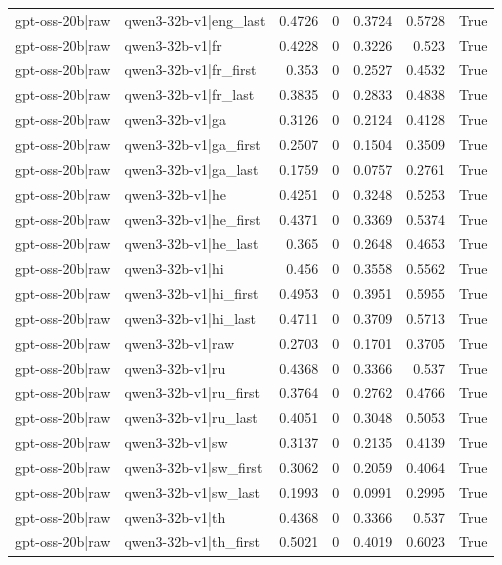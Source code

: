 \begin{table}
\begin{tabular}{l l r r r r l}
gpt-oss-20b|raw & qwen3-32b-v1|eng_last & 0.4726 & 0 & 0.3724 & 0.5728 & True \\
gpt-oss-20b|raw & qwen3-32b-v1|fr & 0.4228 & 0 & 0.3226 & 0.523 & True \\
gpt-oss-20b|raw & qwen3-32b-v1|fr_first & 0.353 & 0 & 0.2527 & 0.4532 & True \\
gpt-oss-20b|raw & qwen3-32b-v1|fr_last & 0.3835 & 0 & 0.2833 & 0.4838 & True \\
gpt-oss-20b|raw & qwen3-32b-v1|ga & 0.3126 & 0 & 0.2124 & 0.4128 & True \\
gpt-oss-20b|raw & qwen3-32b-v1|ga_first & 0.2507 & 0 & 0.1504 & 0.3509 & True \\
gpt-oss-20b|raw & qwen3-32b-v1|ga_last & 0.1759 & 0 & 0.0757 & 0.2761 & True \\
gpt-oss-20b|raw & qwen3-32b-v1|he & 0.4251 & 0 & 0.3248 & 0.5253 & True \\
gpt-oss-20b|raw & qwen3-32b-v1|he_first & 0.4371 & 0 & 0.3369 & 0.5374 & True \\
gpt-oss-20b|raw & qwen3-32b-v1|he_last & 0.365 & 0 & 0.2648 & 0.4653 & True \\
gpt-oss-20b|raw & qwen3-32b-v1|hi & 0.456 & 0 & 0.3558 & 0.5562 & True \\
gpt-oss-20b|raw & qwen3-32b-v1|hi_first & 0.4953 & 0 & 0.3951 & 0.5955 & True \\
gpt-oss-20b|raw & qwen3-32b-v1|hi_last & 0.4711 & 0 & 0.3709 & 0.5713 & True \\
gpt-oss-20b|raw & qwen3-32b-v1|raw & 0.2703 & 0 & 0.1701 & 0.3705 & True \\
gpt-oss-20b|raw & qwen3-32b-v1|ru & 0.4368 & 0 & 0.3366 & 0.537 & True \\
gpt-oss-20b|raw & qwen3-32b-v1|ru_first & 0.3764 & 0 & 0.2762 & 0.4766 & True \\
gpt-oss-20b|raw & qwen3-32b-v1|ru_last & 0.4051 & 0 & 0.3048 & 0.5053 & True \\
gpt-oss-20b|raw & qwen3-32b-v1|sw & 0.3137 & 0 & 0.2135 & 0.4139 & True \\
gpt-oss-20b|raw & qwen3-32b-v1|sw_first & 0.3062 & 0 & 0.2059 & 0.4064 & True \\
gpt-oss-20b|raw & qwen3-32b-v1|sw_last & 0.1993 & 0 & 0.0991 & 0.2995 & True \\
gpt-oss-20b|raw & qwen3-32b-v1|th & 0.4368 & 0 & 0.3366 & 0.537 & True \\
gpt-oss-20b|raw & qwen3-32b-v1|th_first & 0.5021 & 0 & 0.4019 & 0.6023 & True \\

\end{tabular}
\end{table}
